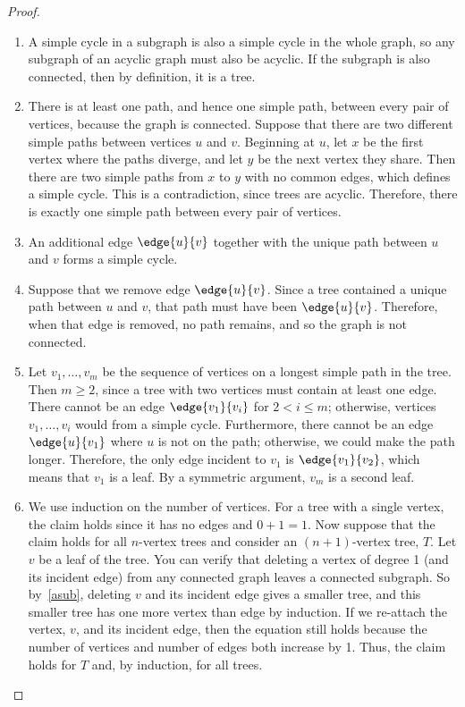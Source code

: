 \begin{proof}
\begin{enumerate}

\item\label{asub} A simple cycle in a subgraph is also a simple cycle in
the whole graph, so any subgraph of an acyclic graph must also be acyclic.
If the subgraph is also connected, then by definition, it is a tree.

\item There is at least one path, and hence one simple path, between every
pair of vertices, because the graph is connected.  Suppose that there are
two different simple paths between vertices $u$ and $v$.  Beginning at
$u$, let $x$ be the first vertex where the paths diverge, and let $y$ be
the next vertex they share.  Then there are two simple paths from $x$ to
$y$ with no common edges, which defines a simple cycle.  This is a
contradiction, since trees are acyclic.  Therefore, there is exactly one
simple path between every pair of vertices.


\item An additional edge $\edge{u}{v}$ together with the unique path
between $u$ and $v$ forms a simple cycle.

\item Suppose that we remove edge $\edge{u}{v}$.  Since a tree
contained a unique path between $u$ and $v$, that path must have been
$\edge{u}{v}$.  Therefore, when that edge is removed, no path remains,
and so the graph is not connected.

\item Let $v_1, \dots, v_m$ be the sequence of vertices on a longest
simple path in the tree.  Then $m \geq 2$, since a tree with two vertices
must contain at least one edge.  There cannot be an edge $\edge{v_1}{v_i}$
for $2 < i \leq m$; otherwise, vertices $v_1, \dots, v_i$ would from a
simple cycle.  Furthermore, there cannot be an edge $\edge{u}{v_1}$ where
$u$ is not on the path; otherwise, we could make the path longer.
Therefore, the only edge incident to $v_1$ is $\edge{v_1}{v_2}$, which
means that $v_1$ is a leaf.  By a symmetric argument, $v_m$ is a second
leaf.

\item We use induction on the number of vertices.  For a tree with a
single vertex, the claim holds since it has no edges and $0 + 1 = 1$.
Now suppose that the claim holds for all $n$-vertex trees and consider an
$(n+1)$-vertex tree, $T$.  Let $v$ be a leaf of the tree.
You can verify that deleting a vertex of degree 1 (and its incident edge)
from any connected graph leaves a connected subgraph.  So by~\eqref{asub},
deleting $v$ and its incident edge gives a smaller tree, and this smaller
tree has one more vertex than edge by induction.  If we re-attach the
vertex, $v$, and its incident edge, then the equation still holds because
the number of vertices and number of edges both increase by 1.  Thus, the
claim holds for $T$ and, by induction, for all trees.
\end{enumerate}
\end{proof}
